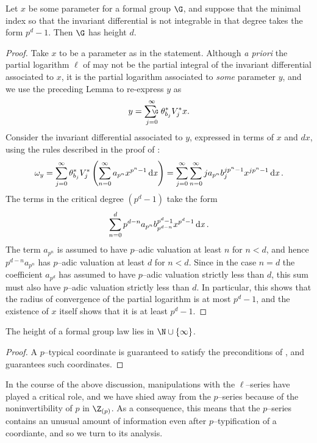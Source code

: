 \begin{corollary}\label{GoodParametersComputeHeight}
Let \(x\) be some parameter for a formal group \(\G\), and suppose that the minimal index so that the invariant differential is not integrable in that degree takes the form \(p^d-1\).  Then \(\G\) has height \(d\).
\end{corollary}
\begin{proof}
Take \(x\) to be a parameter as in the statement.  Although \textit{a priori} the partial logarithm \(\ell\) of  may not be the partial integral of the invariant differential associated to \(x\), it is the partial logarithm associated to \emph{some} parameter \(y\), and we use the preceding Lemma to re-express \(y\) as \[y = \sumfgl{\G}_{j=0}^\infty \theta_{b_j}^* V_j^* x.\]  Consider the invariant differential associated to \(y\), expressed in terms of \(x\) and \(dx\), using the rules described in the proof of : \[\omega_y = \sum_{j=0}^\infty \theta_{b_j}^* V_j^* \left(\sum_{n=0}^\infty a_{p^n} x^{p^n-1} \operatorname{d\mathit{x}}\right) = \sum_{j=0}^\infty \sum_{n=0}^\infty j a_{p^n} b_j^{jp^n-1} x^{jp^n-1} \operatorname{d\mathit{x}}.\]  The terms in the critical degree \((p^d-1)\) take the form \[\sum_{n=0}^d p^{d-n} a_{p^n} b_{p^{d-n}}^{p^d-1} x^{p^d-1} \operatorname{d\mathit{x}}.\]  The term \(a_{p^n}\) is assumed to have \(p\)--adic valuation at least \(n\) for \(n < d\), and hence \(p^{d-n}a_{p^n}\) has \(p\)--adic valuation at least \(d\) for \(n < d\).  Since in the case \(n = d\) the coefficient \(a_{p^d}\) has assumed to have \(p\)--adic valuation strictly less than \(d\), this sum must also have \(p\)--adic valuation strictly less than \(d\).  In particular, this shows that the radius of convergence of the partial logarithm is at most \(p^d-1\), and the existence of \(x\) itself shows that it is at least \(p^d-1\).
\end{proof}

\begin{corollary}\label{FGLHeightIsAnInteger}
The height of a formal group law lies in \(\N \cup \{\infty\}\).
\end{corollary}
\begin{proof}
A \(p\)--typical coordinate is guaranteed to satisfy the preconditions of , and  guarantees such coordinates.
\end{proof}

In the course of the above discussion, manipulations with the \(\ell\)--series have played a critical role, and we have shied away from the \(p\)--series because of the noninvertibility of \(p\) in \(\Z_{(p)}\).  As a consequence, this means that the \(p\)--series contains an unusual amount of information even after \(p\)--typification of a coordiante, and so we turn to its analysis.

